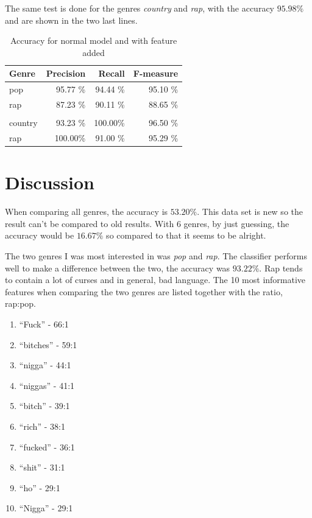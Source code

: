 \documentclass[a4paper, 12pt]{article}
\begin{document}
The same test is done for the genres \textit{country} and \textit{rap}, with the accuracy $95.98\%$ and are shown in the two last lines.

\begin{table}[h]
\begin{center}
    \begin{tabular}{| l | r | r | r |}
        \hline
        Genre & Precision & Recall & F-measure \\
        \hline
        pop     & 95.77 \% & 94.44 \% & 95.10 \% \\ \hline
        rap     & 87.23 \% & 90.11 \% & 88.65 \% \\ \hline
                &          &          &          \\ \hline
        country & 93.23 \% & 100.00\% & 96.50 \% \\ \hline
        rap     & 100.00\% & 91.00 \% & 95.29 \% \\ \hline
    \end{tabular}
    \caption{Accuracy for normal model and with feature added}
    \label{tab:res-stats1}
\end{center}
\end{table}

\section{Discussion}
When comparing all genres, the accuracy is $53.20 \%$.
This data set is new so the result can't be compared to old results.
With 6 genres, by just guessing, the accuracy would be $16.67 \%$ so compared to that it seems to be alright.

The two genres I was most interested in was \textit{pop} and \textit{rap}.
The classifier performs well to make a difference between the two, the accuracy was $93.22 \%$.
Rap tends to contain a lot of curses and in general, bad language.
The 10 most informative features when comparing the two genres are listed together with the ratio, rap:pop.

\begin{enumerate}
    \item{``Fuck'' - 66:1}
    \item{``bitches'' - 59:1}
    \item{``nigga'' - 44:1}
    \item{``niggas'' - 41:1}
    \item{``bitch'' - 39:1}
    \item{``rich'' - 38:1}
    \item{``fucked'' - 36:1}
    \item{``shit'' - 31:1}
    \item{``ho'' - 29:1}
    \item{``Nigga'' - 29:1}
\end{enumerate}
\end{document}
